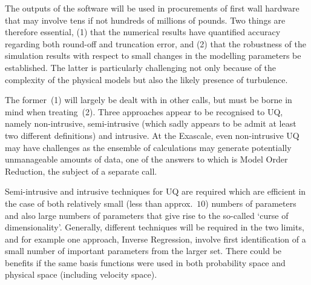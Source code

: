 The outputs of the software will be used in procurements of
first wall hardware that may involve tens if not hundreds of millions
of pounds. Two things are therefore essential, (1) that the numerical
results have quantified accuracy regarding both round-off and truncation
error, and (2) that the robustness of the simulation results with
respect to small changes in the modelling parameters be established.
The latter is particularly challenging not only because of the 
complexity of the physical models but also the likely presence of turbulence.

The former~(1) will largely be dealt with in other calls, but must be
borne in mind when treating~(2). Three approaches appear to be recognised
to UQ, namely non-intrusive, semi-intrusive
(which sadly appears to be admit at least two different definitions)
and intrusive. At the Exascale, even non-intrusive UQ may have challenges
as the ensemble of calculations may generate potentially unmanageable
amounts of data, one of the answers to which is Model Order Reduction,
the subject of a separate call.

Semi-intrusive and intrusive techniques for UQ are required
which are efficient in the case of both relatively small (less
than approx.~$10$) numbers of parameters
and also large numbers of parameters that give
rise to the so-called  `curse of dimensionality'.
Generally, different techniques will be required in
the two limits, and for example one approach, Inverse Regression, involve
first identification of a small number of important parameters
from the larger set. There could be benefits if the same basis
functions were used in both probability space and physical space
(including velocity space).

